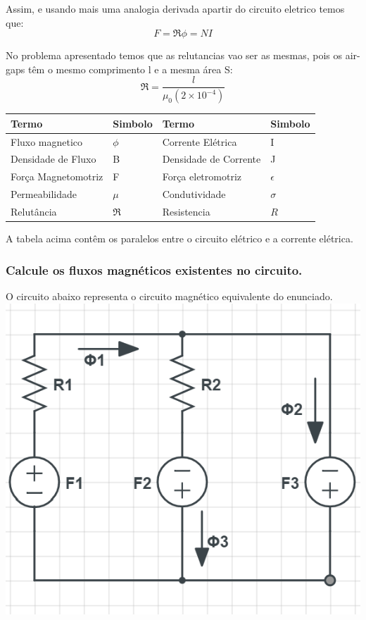 \documentclass{article}
\begin{document}
Assim, e usando mais uma analogia derivada apartir do circuito eletrico temos que:
$$F = \Re\phi  = NI$$

No problema apresentado temos que as relutancias vao ser as mesmas, pois os air-gaps têm o mesmo comprimento l e a mesma área S:
$$\Re = \frac{l}{\mu_0  (2\times 10^{-4})}$$

\begin{center}
    \begin{tabular}{ | l | l | l | p{5cm} |}
    \hline
    Termo & Simbolo & Termo & Simbolo \\ \hline
    Fluxo magnetico & $\phi$ & Corrente Elétrica & I \\ \hline
    Densidade de Fluxo & B & Densidade de Corrente & J \\ \hline
    Força Magnetomotriz & F & Força eletromotriz & $\epsilon$ \\
    \hline
   Permeabilidade & $\mu$ & Condutividade & $\sigma$ \\
    \hline
    Relutância & $\Re$ & Resistencia & $R$ \\
    \hline
    \end{tabular}
\end{center}
A tabela acima contêm os paralelos entre o circuito elétrico e a corrente elétrica.
\subsubsection{Calcule os fluxos magnéticos existentes no circuito.}
O circuito abaixo representa o circuito magnético equivalente do enunciado.
\includegraphics[scale=0.75]{33}
\end{document}
